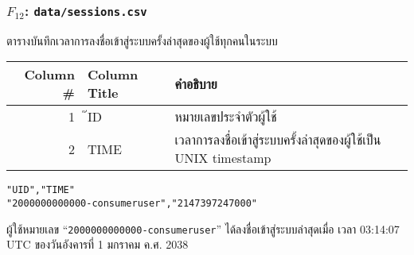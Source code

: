 \begin{minipage}{\textwidth}
\subsubsection[\texttt{data/sessions.csv}]{\texorpdfstring{$ F_{12} $}{File \#12}: \texttt{data/sessions.csv}}\label{subsubsec:csv-f12}

ตารางบันทึกเวลาการลงชื่อเข้าสู่ระบบครั้งล่าสุดของผู้ใช้ทุกคนในระบบ

\begin{tabular}[!hbt]{| r | >{\ttfamily}p{15ex}<{\rmfamily} | p{36ex} |}
\hline
Column \#       & \rmfamily Column Title                & คำอธิบาย\\
\hline
1               & ๊ID                                    & หมายเลขประจำตัวผู้ใช้\\
2               & TIME                                  & เวลาการลงชื่อเข้าสู่ระบบครั้งล่าสุดของผู้ใช้เป็น UNIX timestamp\\
\hline
\end{tabular}


\begin{lstlisting}[caption={\texttt{data/sessions.csv}}]
"UID","TIME"
"2000000000000-consumeruser","2147397247000"
\end{lstlisting}

\begin{description}[labelwidth=*]
    \item[$ \Rightarrow $] ผู้ใช้หมายเลข ``\texttt{2000000000000-consumeruser}'' ได้ลงชื่อเข้าสู่ระบบล่าสุดเมื่อ
เวลา 03:14:07 UTC ของวันอังคารที่ 1 มกราคม ค.ศ. 2038
\end{description}
\end{minipage}


\vspace{3\baselineskip}


